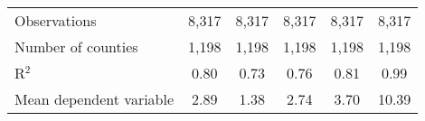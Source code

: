 {\begin{tabular}{l*{5}{c}}
\midrule
Observations        &       8,317         &       8,317         &       8,317         &       8,317         &       8,317         \\
Number of counties  &       1,198         &       1,198         &       1,198         &       1,198         &       1,198         \\
R$^2$               &        0.80         &        0.73         &        0.76         &        0.81         &        0.99         \\
Mean dependent variable&        2.89         &        1.38         &        2.74         &        3.70         &       10.39         \\
\bottomrule
\end{tabular}
}
